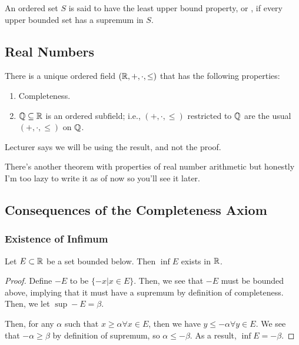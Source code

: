 \documentclass{book}
\begin{document}
\begin{defn}[Completeness]
    An ordered set $S$ is said to have the least upper bound property, or , if every upper bounded set has a supremum in $S$.
\end{defn}

\subsection{Real Numbers}
\begin{thm}
    There is a unique ordered field $(\mathbb{R}, +, \cdot, \leq)$ that has the following properties:
    \begin{enumerate}
        \item Completeness.
        \item $\mathbb{Q} \subseteq \mathbb{R}$ is an ordered subfield; i.e., $(+, \cdot, \leq)$ restricted to $\mathbb{Q}$ are the usual $(+, \cdot, \leq)$ on $\mathbb{Q}$.
    \end{enumerate}
\end{thm}

Lecturer says we will be using the result, and not the proof.

There's another theorem with properties of real number arithmetic but honestly I'm too lazy to write it as of now so you'll see it later.

\subsection{Consequences of the Completeness Axiom}

\subsubsection{Existence of Infimum}
\begin{thm}
    Let $E \subset \mathbb{R}$ be a set bounded below. Then $\inf E$ exists in $\mathbb{R}$.
\end{thm}
    
\begin{proof}
    Define $-E$ to be $\{-x | x \in E\}$. Then, we see that $-E$ must be bounded above, implying that it must have a supremum by definition of completeness. Then, we let $\sup -E = \beta$. 

    Then, for any $\alpha$ such that $x \geq \alpha \forall x \in E$, then we have $y \leq -\alpha \forall y \in E$. We see that $-\alpha \geq \beta$ by definition of supremum, so $\alpha \leq -\beta$. As a result, $\inf E = -\beta$.
\end{proof}
\end{document}
